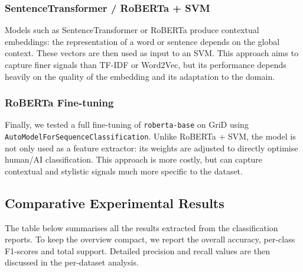 \documentclass[11pt,a4paper]{article}
\begin{document}
\subsubsection{SentenceTransformer / RoBERTa + SVM}
Models such as SentenceTransformer or RoBERTa produce contextual embeddings:
the representation of a word or sentence depends on the global context. These
vectors are then used as input to an SVM. This approach aims to capture finer
signals than TF-IDF or Word2Vec, but its performance depends heavily on the
quality of the embedding and its adaptation to the domain.

\subsubsection{RoBERTa Fine-tuning}
Finally, we tested a full fine-tuning of \texttt{roberta-base} on GriD using
\texttt{AutoModelForSequenceClassification}. Unlike RoBERTa + SVM, the model
is not only used as a feature extractor: its weights are adjusted to directly
optimise human/AI classification. This approach is more costly, but can capture
contextual and stylistic signals much more specific to the dataset.

\subsection{Comparative Experimental Results}
The table below summarises all the results extracted from the classification
reports. To keep the overview compact, we report the overall accuracy,
per-class F1-scores and total support. Detailed precision and recall values
are then discussed in the per-dataset analysis.
\end{document}
